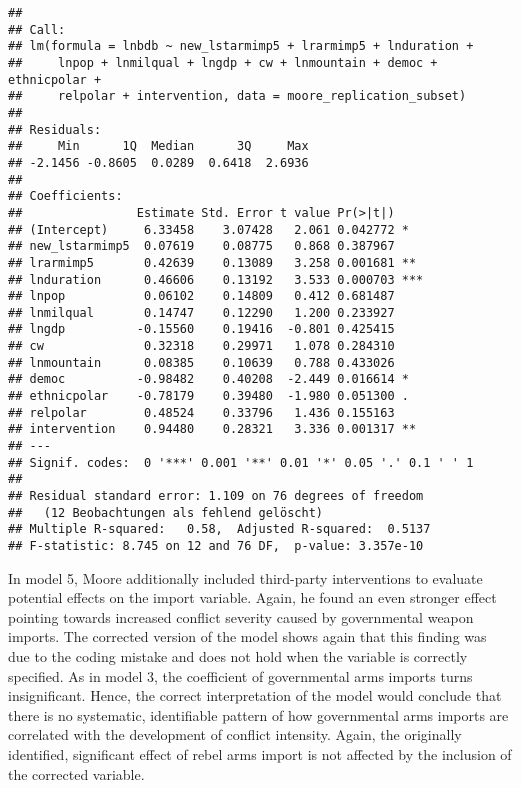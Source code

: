 \documentclass[
]{article}
\begin{document}
\begin{verbatim}
## 
## Call:
## lm(formula = lnbdb ~ new_lstarmimp5 + lrarmimp5 + lnduration + 
##     lnpop + lnmilqual + lngdp + cw + lnmountain + democ + ethnicpolar + 
##     relpolar + intervention, data = moore_replication_subset)
## 
## Residuals:
##     Min      1Q  Median      3Q     Max 
## -2.1456 -0.8605  0.0289  0.6418  2.6936 
## 
## Coefficients:
##                Estimate Std. Error t value Pr(>|t|)    
## (Intercept)     6.33458    3.07428   2.061 0.042772 *  
## new_lstarmimp5  0.07619    0.08775   0.868 0.387967    
## lrarmimp5       0.42639    0.13089   3.258 0.001681 ** 
## lnduration      0.46606    0.13192   3.533 0.000703 ***
## lnpop           0.06102    0.14809   0.412 0.681487    
## lnmilqual       0.14747    0.12290   1.200 0.233927    
## lngdp          -0.15560    0.19416  -0.801 0.425415    
## cw              0.32318    0.29971   1.078 0.284310    
## lnmountain      0.08385    0.10639   0.788 0.433026    
## democ          -0.98482    0.40208  -2.449 0.016614 *  
## ethnicpolar    -0.78179    0.39480  -1.980 0.051300 .  
## relpolar        0.48524    0.33796   1.436 0.155163    
## intervention    0.94480    0.28321   3.336 0.001317 ** 
## ---
## Signif. codes:  0 '***' 0.001 '**' 0.01 '*' 0.05 '.' 0.1 ' ' 1
## 
## Residual standard error: 1.109 on 76 degrees of freedom
##   (12 Beobachtungen als fehlend gelöscht)
## Multiple R-squared:   0.58,  Adjusted R-squared:  0.5137 
## F-statistic: 8.745 on 12 and 76 DF,  p-value: 3.357e-10
\end{verbatim}

In model 5, Moore additionally included third-party interventions to
evaluate potential effects on the import variable. Again, he found an
even stronger effect pointing towards increased conflict severity caused
by governmental weapon imports. The corrected version of the model shows
again that this finding was due to the coding mistake and does not hold
when the variable is correctly specified. As in model 3, the coefficient
of governmental arms imports turns insignificant. Hence, the correct
interpretation of the model would conclude that there is no systematic,
identifiable pattern of how governmental arms imports are correlated
with the development of conflict intensity. Again, the originally
identified, significant effect of rebel arms import is not affected by
the inclusion of the corrected variable.
\end{document}
